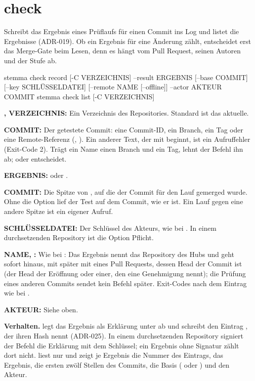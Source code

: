 \section{check}

Schreibt das Ergebnis eines Prüflaufs für einen Commit ins Log und listet die Ergebnisse
(ADR-019). Ob ein Ergebnis für eine Änderung zählt, entscheidet erst das Merge-Gate beim Lesen,
denn es hängt vom Pull Request, seinen Autoren und der Stufe ab.

\starttyping
stemma check record [-C VERZEICHNIS] --result ERGEBNIS [--base COMMIT] [--key SCHLÜSSELDATEI]
        [--remote NAME [--offline]] --actor AKTEUR COMMIT
stemma check list [-C VERZEICHNIS]
\stoptyping

\startitemize
\item {\bf {},  VERZEICHNIS:} Ein Verzeichnis des Repositories.
Standard ist das aktuelle.
\item {\bf COMMIT:} Der getestete Commit: eine Commit-ID, ein Branch, ein Tag oder eine
Remote-Referenz (, ).
Ein anderer Text, der mit  beginnt, ist ein Aufruffehler (Exit-Code 2).
Trägt ein Name einen Branch und ein Tag, lehnt der Befehl ihn ab;
 oder  entscheidet.
\item {\bf {} ERGEBNIS:}  oder .
\item {\bf {} COMMIT:} Die Spitze von , auf die der Commit für den Lauf
gemerged wurde. Ohne die Option lief der Test auf dem Commit, wie er ist. Ein Lauf gegen eine
andere Spitze ist ein eigener Aufruf.
\item {\bf {} SCHLÜSSELDATEI:} Der Schlüssel des Akteurs, wie bei . In einem
durchsetzenden Repository ist die Option Pflicht.
\item {\bf {} NAME, :} Wie bei : Das Ergebnis nennt
das Repository des Hubs und geht sofort hinaus, mit  später mit 
eines Pull Requests, dessen Head der Commit ist (der Head der Eröffnung oder einer, den eine
Genehmigung nennt); die Prüfung eines anderen Commits sendet kein Befehl später.
Exit-Codes nach dem Eintrag wie bei .
\item {\bf {} AKTEUR:} Siehe oben.
\stopitemize

{\bf Verhalten.}  legt das Ergebnis als Erklärung unter 
ab und schreibt den Eintrag , der ihren Hash nennt (ADR-025). In einem
durchsetzenden Repository signiert der Befehl die Erklärung mit dem Schlüssel; ein Ergebnis
ohne Signatur zählt dort nicht.  liest nur und zeigt je Ergebnis die Nummer des
Eintrags, das
Ergebnis, die ersten zwölf Stellen des Commits, die Basis ( oder
) und den Akteur.

